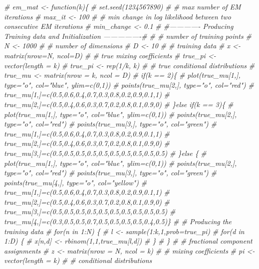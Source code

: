 \documentclass[]{article}
\newenvironment{Shaded}{\begin{snugshade}}{\end{snugshade}}
\newcommand{\CommentTok}[1]{\textcolor[rgb]{0.56,0.35,0.01}{\textit{#1}}}
\begin{document}
\begin{Shaded}
\begin{Highlighting}[]
\CommentTok{# em_mat <- function(k)\{}
\CommentTok{# set.seed(1234567890)}
\CommentTok{# # max number of EM iterations}
\CommentTok{# max_it <- 100}
\CommentTok{# # min change in log likelihood between two consecutive EM iterations}
\CommentTok{# min_change <- 0.1}
\CommentTok{# #------------- Producing Training data and Initialization ----------------#}
\CommentTok{# # number of training points}
\CommentTok{# N <- 1000}
\CommentTok{# # number of dimensions}
\CommentTok{# D <- 10}
\CommentTok{# # training data}
\CommentTok{# x <- matrix(nrow=N, ncol=D)}
\CommentTok{# # true mixing coefficients}
\CommentTok{# true_pi <- vector(length = k)}
\CommentTok{# true_pi <- rep(1/k, k)}
\CommentTok{# # true conditional distributions}
\CommentTok{# true_mu <- matrix(nrow = k, ncol = D)}
\CommentTok{# if(k == 2)\{}
\CommentTok{# plot(true_mu[1,], type="o", col="blue", ylim=c(0,1))}
\CommentTok{# points(true_mu[2,], type="o", col="red")}
\CommentTok{# true_mu[1,]=c(0.5,0.6,0.4,0.7,0.3,0.8,0.2,0.9,0.1,1)}
\CommentTok{# true_mu[2,]=c(0.5,0.4,0.6,0.3,0.7,0.2,0.8,0.1,0.9,0)}
\CommentTok{# \}else if(k == 3)\{}
\CommentTok{# plot(true_mu[1,], type="o", col="blue", ylim=c(0,1))}
\CommentTok{# points(true_mu[2,], type="o", col="red")}
\CommentTok{# points(true_mu[3,], type="o", col="green")}
\CommentTok{# true_mu[1,]=c(0.5,0.6,0.4,0.7,0.3,0.8,0.2,0.9,0.1,1)}
\CommentTok{# true_mu[2,]=c(0.5,0.4,0.6,0.3,0.7,0.2,0.8,0.1,0.9,0)}
\CommentTok{# true_mu[3,]=c(0.5,0.5,0.5,0.5,0.5,0.5,0.5,0.5,0.5,0.5)}
\CommentTok{# \}else \{}
\CommentTok{# plot(true_mu[1,], type="o", col="blue", ylim=c(0,1))}
\CommentTok{# points(true_mu[2,], type="o", col="red")}
\CommentTok{# points(true_mu[3,], type="o", col="green")}
\CommentTok{# points(true_mu[4,], type="o", col="yellow")}
\CommentTok{# true_mu[1,]=c(0.5,0.6,0.4,0.7,0.3,0.8,0.2,0.9,0.1,1)}
\CommentTok{# true_mu[2,]=c(0.5,0.4,0.6,0.3,0.7,0.2,0.8,0.1,0.9,0)}
\CommentTok{# true_mu[3,]=c(0.5,0.5,0.5,0.5,0.5,0.5,0.5,0.5,0.5,0.5)}
\CommentTok{# true_mu[4,]=c(0.3,0.5,0.5,0.7,0.5,0.5,0.5,0.5,0.4,0.5)\}}
\CommentTok{# # Producing the training data}
\CommentTok{# for(n in 1:N) \{}
\CommentTok{# l <- sample(1:k,1,prob=true_pi)}
\CommentTok{# for(d in 1:D) \{}
\CommentTok{# x[n,d] <- rbinom(1,1,true_mu[l,d])}
\CommentTok{# \}}
\CommentTok{# \}}
\CommentTok{# # fractional component assignments}
\CommentTok{# z <- matrix(nrow = N, ncol = k)}
\CommentTok{# # mixing coefficients}
\CommentTok{# pi <- vector(length = k)}
\CommentTok{# # conditional distributions}

\end{Highlighting}
\end{Shaded}
\end{document}

